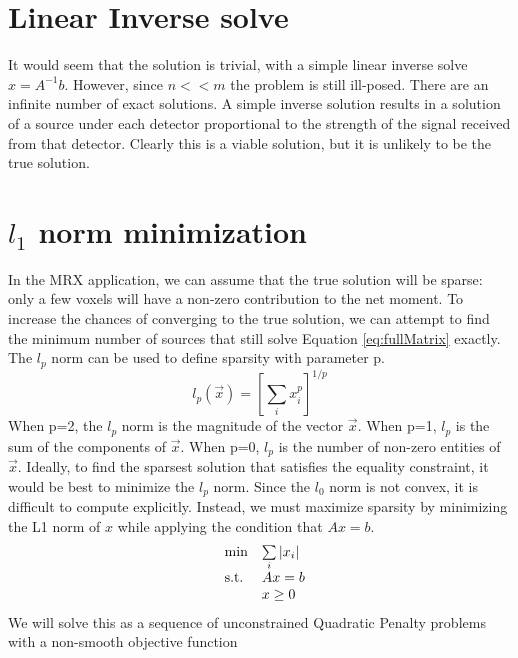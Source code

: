 \documentclass[a4paper]{article}
\begin{document}
\section{Linear Inverse solve}
It would seem that the solution is trivial, with a simple linear inverse solve $x=A^{-1}b$.  However, since $n<<m$ the problem is still ill-posed.  There are an infinite number of exact solutions.  A simple inverse solution results in a solution of a source under each detector proportional to the strength of the signal received from that detector.  Clearly this is a viable solution, but it is unlikely to be the true solution.  

\section{$l_1$ norm minimization}
In the MRX application, we can assume that the true solution will be sparse:
only a few voxels will have a non-zero contribution to the net moment.  To
increase the chances of converging to the true solution, we can attempt to
find the minimum number of sources that still solve Equation
\ref{eq:fullMatrix} exactly.  The $l_p$ norm can be used to define sparsity with parameter p.
 \begin{equation}
 l_{p}(\vec{x})=\left[\sum_{i}x_{i}^{p}\right]^{1/p} 
 \end{equation}
When p=2, the $l_{p}$ norm is the magnitude of the vector $\vec{x}$.  When p=1, $l_{p}$ is the sum of the components of $\vec{x}$.  When p=0, $l_{p}$ is the number of non-zero entities of $\vec{x}$.  Ideally, to find the sparsest solution that satisfies the equality constraint, it would be best to minimize the $l_{p}$ norm.  Since the $l_0$ norm is not convex, it is difficult to compute explicitly. Instead, we must maximize sparsity by minimizing the L1 norm of $x$ while applying the condition that $Ax = b$.
\begin{equation}
\centering
  \begin{array}{ll@{}r@{}r@{}l}
    \text{min} & \sum\limits_{i} |x_i| \\[\jot]
    \text{s.t.}& Ax = b \\
    & \multicolumn{4}{l}{x \geq 0}
  \end{array}
\end{equation}
We will solve this as a sequence of unconstrained Quadratic
Penalty problems with a non-smooth objective function
\end{document}
